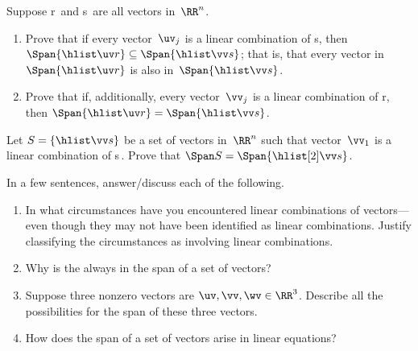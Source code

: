\begin{exercise}  
Suppose \hlist\uv r\ and \hlist\vv s\ are all vectors in~\(\RR^n\).
\begin{enumerate}
\item Prove that if every vector~\(\uv_j\) is a linear combination of \hlist\vv s, then \(\Span\{\hlist\uv r\}\subseteq\Span\{\hlist\vv s\}\); that is, that every vector in~\(\Span\{\hlist\uv r\}\) is also in~\(\Span\{\hlist\vv s\}\).
\item  Prove that if, additionally, every vector~\(\vv_j\) is a linear combination of \hlist\uv r, then \(\Span\{\hlist\uv r\}=\Span\{\hlist\vv s\}\).
\end{enumerate}
\end{exercise}





\begin{exercise}  
Let \(S=\{\hlist\vv s\}\) be a set of vectors in~\(\RR^n\) such that vector~\(\vv_1\) is a linear combination of \hlist[2]\vv s\,.  
Prove that \(\Span S=\Span\{\hlist[2]\vv s\}\).
\end{exercise}







\begin{exercise}  
In a few sentences, answer\slash discuss each of the following.
\begin{enumerate}
\item In what circumstances have you encountered linear combinations of vectors---even though they may not have been identified as linear combinations.
Justify classifying the circumstances as involving linear combinations. 


\item Why is the  always in the span of a set of vectors?

\item Suppose three nonzero vectors are \(\uv,\vv,\wv\in\RR^3\).  
Describe all the possibilities for the span of these three vectors.

\item How does the span of a set of vectors arise in linear equations?

\end{enumerate}
\end{exercise}

